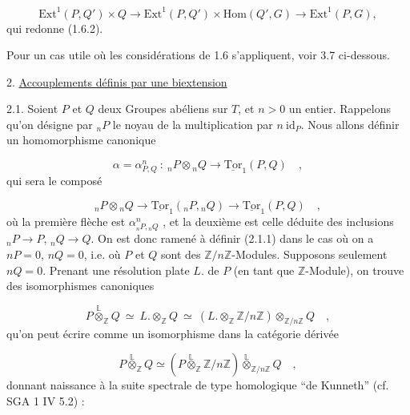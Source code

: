 \begin{equation}\tag{1.6.3}
\mathrm{Ext}^1(P,Q') \times Q \to \mathrm{Ext}^1(P,Q') \times \mathrm{Hom}(Q',G) \longrightarrow \mathrm{Ext}^1(P,G),
\end{equation}
qui redonne (1.6.2).

Pour un cas utile où les considérations de 1.6 s'appliquent, voir 3.7 ci-dessous.


2. \underline{Accouplements définis par une biextension}

2.1.  Soient $P$ et $Q$ deux Groupes abéliens sur $T$, et $n > 0$ un entier. Rappelons qu'on désigne par ${}_nP$ le noyau de la multiplication par $n \ \mathrm{id}_P$. Nous allons définir un homomorphisme canonique 



\begin{equation}\tag{2.1.1}
 \alpha = \alpha^n_{P,Q} \ : \ {}_nP \otimes {}_nQ \longrightarrow \underline{\mathrm{Tor}}_1(P,Q) \quad ,
\end{equation}
qui sera le composé

\begin{equation}\tag{2.1.2}
{}_nP \otimes {}_nQ \longrightarrow \underline{\mathrm{Tor}}_1({}_nP,{}_nQ) \longrightarrow \underline{\mathrm{Tor}}_1(P,Q) \quad ,
\end{equation}
où la première flèche est $\alpha^n_{{}_nP,{}_nQ}$ , et la deuxième est celle déduite des inclusions ${}_nP \longrightarrow P$, ${}_nQ \longrightarrow Q$. On est donc ramené à définir (2.1.1) dans le cas où on a $nP = 0$, $nQ = 0$, i.e. où $P$ et $Q$ sont des $\mathbb{Z}/n\mathbb{Z}$-Modules. Supposons seulement $nQ = 0$. Prenant une résolution plate $L.$ de $P$ (en tant que $\mathbb{Z}$-Module), on trouve des isomorphismes canoniques

\begin{equation*}
P \overset{\mathbb{L}}{\otimes}_{\mathbb{Z}} Q \ \simeq \ L. \otimes_{\mathbb{Z}} Q \ \simeq \ (L. \otimes_{\mathbb{Z}} \mathbb{Z}/n\mathbb{Z}) \otimes_{\mathbb{Z}/n\mathbb{Z}} Q \quad ,
\end{equation*}
qu'on peut écrire comme un isomorphisme dans la catégorie dérivée

\begin{equation}\tag{2.1.3}
P \overset{\mathbb{L}}{\otimes}_{\mathbb{Z}} Q \simeq (P \overset{\mathbb{L}}{\otimes}_{\mathbb{Z}} \mathbb{Z}/n\mathbb{Z}) \overset{\mathbb{L}}{\otimes}_{\mathbb{Z}/n\mathbb{Z}} Q \quad ,
\end{equation}
donnant naissance à la suite spectrale de type homologique ``de Kunneth'' (cf. SGA 1 IV 5.2) :

